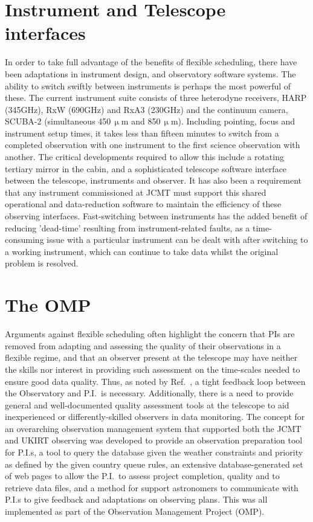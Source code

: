 \documentclass[]{spie}  %
\begin{document}
\section{Instrument and Telescope interfaces}\label{sec:inst}

In order to take full advantage of the benefits of flexible
scheduling, there have been adaptations in instrument design, and
observatory software systems. The ability to switch swiftly between
instruments is perhaps the most powerful of these. The current
instrument suite consists of three heterodyne receivers, HARP
(345GHz), RxW (690GHz) and RxA3 (230GHz) and the continuum camera,
SCUBA-2 (simultaneous 450\,$\upmu$m and 850\,$\upmu$m). Including pointing,
focus and instrument setup times, it takes less than fifteen minutes
to switch from a completed observation with one instrument to the
first science observation with another. The critical developments
required to allow this include a rotating tertiary mirror in the
cabin, and a sophisticated telescope software interface between the
telescope, instruments and observer.\cite{rees2002,2011tfa..confE..42J} It has also
been a requirement that any instrument commissioned at JCMT must
support this shared operational and data-reduction software\cite{cavanagh2008} to
maintain the efficiency of these observing interfaces. Fast-switching
between instruments has the added benefit of reducing 'dead-time'
resulting from instrument-related faults, as a time-consuming issue
with a particular instrument can be dealt with after switching to a
working instrument, which can continue to take data whilst the
original problem is resolved.



\section{The OMP}\label{sec:omp}

Arguments against flexible scheduling often highlight the concern that
PIs are removed from adapting and assessing the quality of their
observations in a flexible regime, and that an observer present at the
telescope may have neither the skills nor interest in providing such
assessment on the time-scales needed to ensure good data
quality. Thus, as noted by Ref.\ , a tight
feedback loop between the Observatory and P.I.\ is
necessary. Additionally, there is a need to provide general and
well-documented quality assessment tools at the telescope to aid
inexperienced or differently-skilled observers in data monitoring. The
concept for an overarching observation management system that
supported both the JCMT and UKIRT observing was developed to provide
an observation preparation tool for P.I.s, a tool to query the
database given the weather constraints and priority as defined by the
given country queue rules, an extensive database-generated set of web
pages to allow the P.I.\ to assess project completion, quality and to
retrieve data files, and a method for support astronomers to
communicate with P.I.s to give feedback and adaptations on observing
plans. This was all implemented as part of the Observation Management
Project (OMP)\cite{2011tfa..confE..42J,economou2002}.
\end{document}
